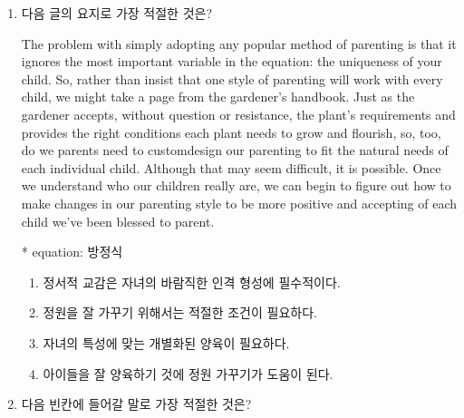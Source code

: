 \documentclass[a4paper, twocolumn]{oblivoir}
\begin{document}
\begin{enumerate}
        \item 다음 글의 요지로 가장 적절한 것은?
        
                The problem with simply adopting any popular method of
        parenting is that it ignores the most important variable in
        the equation: the uniqueness of your child. So, rather than
        insist that one style of parenting will work with every child,
        we might take a page from the gardener’s handbook. Just as
        the gardener accepts, without question or resistance, the
        plant’s requirements and provides the right conditions each
        plant needs to grow and flourish, so, too, do we parents
        need to custom­design our parenting to fit the natural needs
        of each individual child. Although that may seem difficult, it
        is possible. Once we understand who our children really are,
        we can begin to figure out how to make changes in our
        parenting style to be more positive and accepting of each
        child we’ve been blessed to parent.
        \begin{flushright}
            \small{* equation: 방정식}     
        \end{flushright}
        \begin{enumerate}
            \item 정서적 교감은 자녀의 바람직한 인격 형성에 필수적이다. 
            \item 정원을 잘 가꾸기 위해서는 적절한 조건이 필요하다. 
            \item 자녀의 특성에 맞는 개별화된 양육이 필요하다. 
            \item 아이들을 잘 양육하기 것에 정원 가꾸기가 도움이 된다. 
        \end{enumerate}

        \pagebreak
        \item 다음 빈칸에 들어갈 말로 가장 적절한 것은?
        

\end{enumerate}
\end{document}
